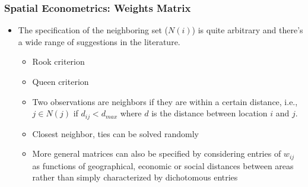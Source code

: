\documentclass[
  shownotes,
  xcolor={svgnames},
  hyperref={colorlinks,citecolor=DarkBlue,linkcolor=DarkRed,urlcolor=DarkBlue}
   , aspectratio=169]{beamer}
\begin{document}
\begin{frame}[fragile]
\frametitle{Spatial Econometrics: Weights Matrix}



\begin{itemize}
\item The specification of  the neighboring set ($N(i)$) is quite arbitrary and there's a wide range of suggestions in the literature. 
\bigskip
  \begin{itemize}
    \item Rook criterion
    \medskip
    \item Queen criterion
    \medskip
    \item Two observations are neighbors if they are within a certain distance, i.e., $j\in N(j)$ if $d_{ij} < d_{max}$ where $d$ is the distance between location $i$ and $j$. 
    \medskip
    \item Closest neighbor, ties can be solved randomly
    \medskip
    \item More general matrices can also be specified by considering entries of $w_{ij}$ as functions of geographical, economic or social distances between areas rather than simply characterized by dichotomous entries 
  \end{itemize}
\end{itemize}


\end{frame}
\end{document}
